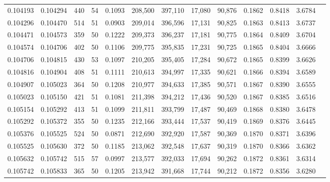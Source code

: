 \begin{tabular}{rrrrrrrrrrrrr}
0.104193 & 0.104294 &   440 &  54 &                                     0.1093 & 208,500 & 397,110 &  17,080 &  90,876 & 0.1862 & 0.8418 & 3.6784 \\
0.104296 & 0.104470 &   514 &  51 &                                     0.0903 & 209,014 & 396,596 &  17,131 &  90,825 & 0.1863 & 0.8413 & 3.6737 \\
0.104471 & 0.104573 &   359 &  50 &                                     0.1222 & 209,373 & 396,237 &  17,181 &  90,775 & 0.1864 & 0.8409 & 3.6704 \\
0.104574 & 0.104706 &   402 &  50 &                                     0.1106 & 209,775 & 395,835 &  17,231 &  90,725 & 0.1865 & 0.8404 & 3.6666 \\
0.104706 & 0.104815 &   430 &  53 &                                     0.1097 & 210,205 & 395,405 &  17,284 &  90,672 & 0.1865 & 0.8399 & 3.6626 \\
0.104816 & 0.104904 &   408 &  51 &                                     0.1111 & 210,613 & 394,997 &  17,335 &  90,621 & 0.1866 & 0.8394 & 3.6589 \\
0.104907 & 0.105023 &   364 &  50 &                                     0.1208 & 210,977 & 394,633 &  17,385 &  90,571 & 0.1867 & 0.8390 & 3.6555 \\
0.105023 & 0.105150 &   421 &  51 &                                     0.1081 & 211,398 & 394,212 &  17,436 &  90,520 & 0.1867 & 0.8385 & 3.6516 \\
0.105154 & 0.105292 &   413 &  51 &                                     0.1099 & 211,811 & 393,799 &  17,487 &  90,469 & 0.1868 & 0.8380 & 3.6478 \\
0.105292 & 0.105372 &   355 &  50 &                                     0.1235 & 212,166 & 393,444 &  17,537 &  90,419 & 0.1869 & 0.8376 & 3.6445 \\
0.105376 & 0.105525 &   524 &  50 &                                     0.0871 & 212,690 & 392,920 &  17,587 &  90,369 & 0.1870 & 0.8371 & 3.6396 \\
0.105525 & 0.105630 &   372 &  50 &                                     0.1185 & 213,062 & 392,548 &  17,637 &  90,319 & 0.1870 & 0.8366 & 3.6362 \\
0.105632 & 0.105742 &   515 &  57 &                                     0.0997 & 213,577 & 392,033 &  17,694 &  90,262 & 0.1872 & 0.8361 & 3.6314 \\
0.105742 & 0.105833 &   365 &  50 &                                     0.1205 & 213,942 & 391,668 &  17,744 &  90,212 & 0.1872 & 0.8356 & 3.6280 \\

\end{tabular}

